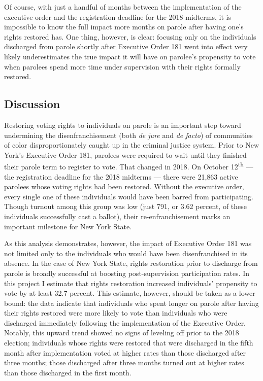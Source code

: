 \documentclass[12pt,]{article}
\begin{document}
Of course, with just a handful of months between the implementation of the executive order and the registration deadline for the 2018 midterms, it is impossible to know the full impact more months on parole after having one's rights restored has. One thing, however, is clear: focusing only on the individuals discharged from parole shortly after Executive Order 181 went into effect very likely underestimates the true impact it will have on parolee's propensity to vote when parolees spend more time under supervision with their rights formally restored.

\hypertarget{discussion-1}{%
\subsection*{Discussion}\label{discussion-1}}

Restoring voting rights to individuals on parole is an important step toward undermining the disenfranchisement (both \emph{de jure} and \emph{de facto}) of communities of color disproportionately caught up in the criminal justice system. Prior to New York's Executive Order 181, parolees were required to wait until they finished their parole term to register to vote. That changed in 2018. On October 12\textsuperscript{th} --- the registration deadline for the 2018 midterms --- there were 21,863 active parolees whose voting rights had been restored. Without the executive order, every single one of these individuals would have been barred from participating. Though turnout among this group was low (just 791, or 3.62 percent, of these individuals successfully cast a ballot), their re-enfranchisement marks an important milestone for New York State.

As this analysis demonstrates, however, the impact of Executive Order 181 was not limited only to the individuals who would have been disenfranchised in its absence. In the case of New York State, rights restoration prior to discharge from parole is broadly successful at boosting post-supervision participation rates. In this project I estimate that rights restoration increased individuals' propensity to vote by at least 32.7 percent. This estimate, however, should be taken as a lower bound: the data indicate that individuals who spent longer on parole after having their rights restored were more likely to vote than individuals who were discharged immediately following the implementation of the Executive Order. Notably, this upward trend showed no signs of leveling off prior to the 2018 election; individuals whose rights were restored that were discharged in the fifth month after implementation voted at higher rates than those discharged after three months; those discharged after three months turned out at higher rates than those discharged in the first month.
\end{document}
